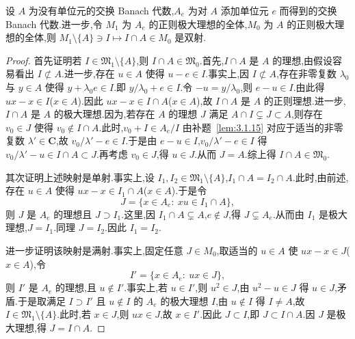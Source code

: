 \begin{theorem}\label{thm:3.1.16}
设 $A$ 为没有单位元的交换 Banach 代数,$A_{e}$ 为对 $A$ 添加单位元 $e$ 而得到的交换 Banach 代数.进一步,令 $M_{1}$ 为 $A_{e}$ 的正则极大理想的全体,$M_{0}$ 为 $A$ 的正则极大理想的全体,则 $M_{1} \setminus \{A\} \ni I \mapsto I \cap A \in M_{0}$ 是双射.
\end{theorem}

\begin{proof}
首先证明若 $I \in \mathfrak{M}_{1} \setminus \{A\}$,则 $I \cap A \in \mathfrak{M}_{0}$.首先,$I \cap A$ 是 $A$ 的理想,由假设容易看出 $I \not\subset A$.进一步,存在 $u \in A$ 使得 $u - e \in I$.事实上,因 $I \not\subset A$,存在非零复数 $\lambda_{0}$ 与 $y \in A$ 使得 $y + \lambda_{0}e \in I$.即 $y/\lambda_{0} + e \in I$.令 $-u = y/\lambda_{0}$,则 $e - u \in I$.由此得 $ux - x \in I$($x \in A$).因此 $ux - x \in I \cap A$($x \in A$),故 $I \cap A$ 是 $A$ 的正则理想.进一步,$I \cap A$ 是 $A$ 的极大理想.因为,若存在 $A$ 的理想 $J$ 满足 $A \cap I \subsetneq J \subset A$,则存在 $v_{0} \in J$ 使得 $v_{0} \notin I \cap A$.此时,$v_{0} + I \in A_{e}/I$ 由补题~\ref{lem:3.1.15} 对应于适当的非零复数 $\lambda' \in \mathbf{C}$,故 $v_{0}/\lambda' - e \in I$.于是由 $e - u \in I$,$v_{0}/\lambda' - e \in I$ 得 $v_{0}/\lambda' - u \in I \cap A \subset J$.再考虑 $v_{0} \in J$,得 $u \in J$.从而 $J = A$.综上得 $I \cap A \in \mathfrak{M}_{0}$.

其次证明上述映射是单射.事实上,设 $I_{1}, I_{2} \in \mathfrak{M}_{1} \setminus \{A\}$,$I_{1} \cap A = I_{2} \cap A$.此时,由前述,存在 $u \in A$ 使得 $ux - x \in I_{1} \cap A$($x \in A$).于是令
\begin{equation*}
J = \{x \in A_{e}:\ xu \in I_{1} \cap A\},
\end{equation*}
则 $J$ 是 $A_{e}$ 的理想且 $J \supset I_{1}$.这里,因 $I_{1} \cap A \subsetneq A$,$e \notin J$,得 $J \subsetneq A_{e}$.从而由 $I_{1}$ 是极大理想,$J = I_{1}$.同理 $J = I_{2}$.因此 $I_{1} = I_{2}$.

进一步证明该映射是满射.事实上,固定任意 $J \in M_{0}$,取适当的 $u \in A$ 使 $ux - x \in J$($x \in A$),令
\begin{equation*}
I' = \{x \in A_{e}:\ ux \in J\},
\end{equation*}
则 $I'$ 是 $A_{e}$ 的理想,且 $u \notin I'$.事实上,若 $u \in I'$,则 $u^{2} \in J$,由 $u^{2} - u \in J$ 得 $u \in J$,矛盾.于是取满足 $I \supset I'$ 且 $u \notin I$ 的 $A_{e}$ 的极大理想 $I$,由 $u \notin I$ 得 $I \neq A$,故 $I \in \mathfrak{M}_{1} \setminus \{A\}$.此时,若 $x \in J$,则 $ux \in J$,故 $x \in I'$.因此 $J \subset I$,即 $J \subset I \cap A$.因 $J$ 是极大理想,得 $J = I \cap A$.
\end{proof}

